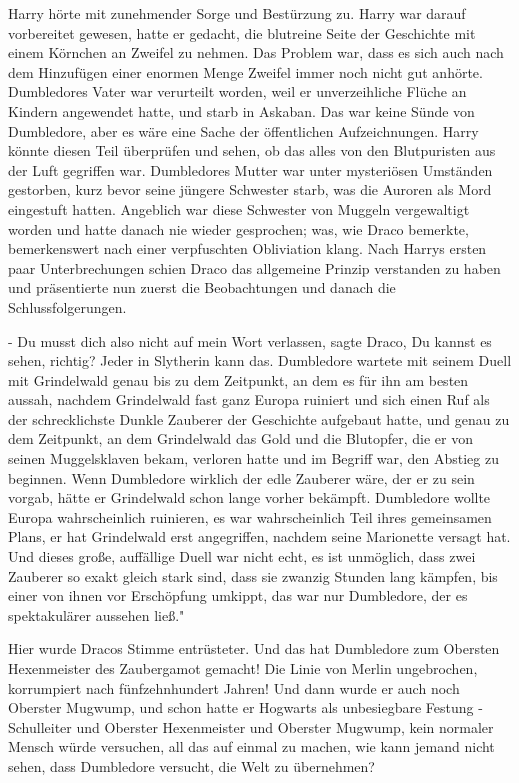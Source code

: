 Harry hörte mit zunehmender Sorge und Bestürzung zu. Harry war darauf
vorbereitet gewesen, hatte er gedacht, die blutreine Seite der Geschichte mit
einem Körnchen an Zweifel zu nehmen. Das Problem war, dass es sich auch nach dem
Hinzufügen einer enormen Menge Zweifel immer noch nicht gut anhörte. Dumbledores
Vater war verurteilt worden, weil er unverzeihliche Flüche an Kindern angewendet
hatte, und starb in Askaban. Das war keine Sünde von Dumbledore, aber es wäre
eine Sache der öffentlichen Aufzeichnungen. Harry könnte diesen Teil überprüfen
und sehen, ob das alles von den Blutpuristen aus der Luft gegriffen war.
Dumbledores Mutter war unter mysteriösen Umständen gestorben, kurz bevor seine
jüngere Schwester starb, was die Auroren als Mord eingestuft hatten. Angeblich
war diese Schwester von Muggeln vergewaltigt worden und hatte danach nie wieder
gesprochen; was, wie Draco bemerkte, bemerkenswert nach einer verpfuschten
Obliviation klang. Nach Harrys ersten paar Unterbrechungen schien Draco das
allgemeine Prinzip verstanden zu haben und präsentierte nun zuerst die
Beobachtungen und danach die Schlussfolgerungen.

\glqq - Du musst dich also nicht auf mein Wort verlassen\grqq{}, sagte Draco,
\glqq Du kannst es sehen, richtig? Jeder in Slytherin kann das. Dumbledore
wartete mit seinem Duell mit Grindelwald genau bis zu dem Zeitpunkt, an dem es
für ihn am besten aussah, nachdem Grindelwald fast ganz Europa ruiniert und sich
einen Ruf als der schrecklichste Dunkle Zauberer der Geschichte aufgebaut hatte,
und genau zu dem Zeitpunkt, an dem Grindelwald das Gold und die Blutopfer, die
er von seinen Muggelsklaven bekam, verloren hatte und im Begriff war, den
Abstieg zu beginnen. Wenn Dumbledore wirklich der edle Zauberer wäre, der er zu
sein vorgab, hätte er Grindelwald schon lange vorher bekämpft. Dumbledore wollte
Europa wahrscheinlich ruinieren, es war wahrscheinlich Teil ihres gemeinsamen
Plans, er hat Grindelwald erst angegriffen, nachdem seine Marionette versagt
hat. Und dieses große, auffällige Duell war nicht echt, es ist unmöglich, dass
zwei Zauberer so exakt gleich stark sind, dass sie zwanzig Stunden lang kämpfen,
bis einer von ihnen vor Erschöpfung umkippt, das war nur Dumbledore, der es
spektakulärer aussehen ließ."

Hier wurde Dracos Stimme entrüsteter. \glqq Und das hat Dumbledore zum Obersten
Hexenmeister des Zaubergamot gemacht! Die Linie von Merlin ungebrochen,
korrumpiert nach fünfzehnhundert Jahren! Und dann wurde er auch noch Oberster
Mugwump, und schon hatte er Hogwarts als unbesiegbare Festung - Schulleiter und
Oberster Hexenmeister und Oberster Mugwump, kein normaler Mensch würde
versuchen, all das auf einmal zu machen, wie kann jemand nicht sehen, dass
Dumbledore versucht, die Welt zu übernehmen?\grqq{}

